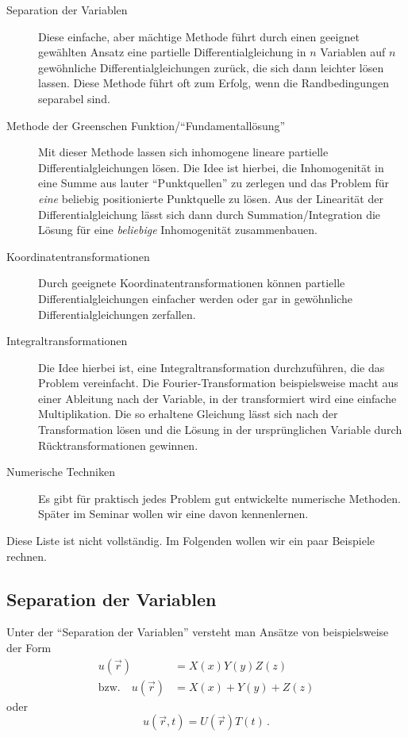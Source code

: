\documentclass[paper=a4, fontsize=11.0pt, abstractoff, DIV12]{scrartcl}
\begin{document}
\begin{description}
    \item[Separation der Variablen]
    Diese einfache, aber mächtige Methode führt durch einen geeignet
    gewählten Ansatz eine partielle Differentialgleichung in $n$ Variablen
    auf $n$ gewöhnliche Differentialgleichungen zurück, die sich dann
    leichter lösen lassen. Diese Methode führt oft zum Erfolg, wenn die
    Randbedingungen separabel sind.
    \item[Methode der Greenschen Funktion/``Fundamentallösung'']
    Mit dieser Methode lassen sich inhomogene lineare partielle
    Differentialgleichungen lösen. Die Idee ist hierbei, die Inhomogenität
    in eine Summe aus lauter ``Punktquellen'' zu zerlegen und das Problem
    für \emph{eine} beliebig positionierte Punktquelle zu lösen. Aus der
    Linearität der Differentialgleichung lässt sich dann durch
    Summation/Integration die Lösung für eine \emph{beliebige} Inhomogenität
    zusammenbauen.
    \item[Koordinatentransformationen]
    Durch geeignete Koordinatentransformationen können partielle
    Differentialgleichungen einfacher werden oder gar in gewöhnliche
    Differentialgleichungen zerfallen.
    \item[Integraltransformationen]
    Die Idee hierbei ist, eine Integraltransformation durchzuführen, die das
    Problem vereinfacht. Die Fourier-Transformation beispielsweise macht aus
    einer Ableitung nach der Variable, in der transformiert wird eine
    einfache Multiplikation. Die so erhaltene Gleichung lässt sich nach der
    Transformation lösen und die Lösung in der ursprünglichen Variable durch
    Rücktransformationen gewinnen.
    \item[Numerische Techniken]
    Es gibt für praktisch jedes Problem gut entwickelte numerische Methoden.
    Später im Seminar wollen wir eine davon kennenlernen.
\end{description}
Diese Liste ist nicht vollständig. Im Folgenden wollen wir ein paar Beispiele
rechnen.

\subsection{Separation der Variablen}

Unter der ``Separation der Variablen'' versteht man Ansätze von beispielsweise der Form
\begin{align}
u(\vec r) &= X(x)Y(y)Z(z)\\
\text{bzw.}\quad u(\vec r) &= X(x)+Y(y)+Z(z)
\end{align}
oder
\begin{equation}
u(\vec r, t) = U(\vec r)T(t)\, .
\end{equation}
\end{document}
